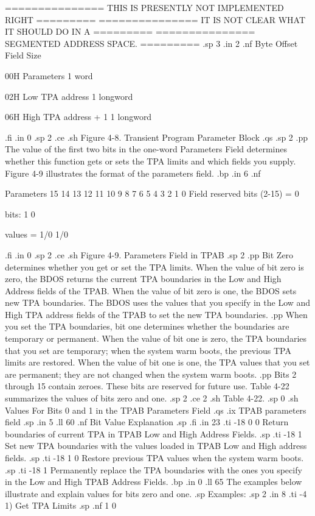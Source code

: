 =============== THIS IS PRESENTLY NOT IMPLEMENTED RIGHT =========
=============== IT IS NOT CLEAR WHAT IT SHOULD DO IN A  =========
=============== SEGMENTED ADDRESS SPACE.                =========
.sp 3
.in 2
.nf
Byte Offset            Field                        Size
   
 00H              Parameters                       1 word  

 02H              Low TPA address                  1 longword

 06H              High TPA address + 1             1 longword

.fi
.in 0
.sp 2
.ce
.sh 
Figure 4-8.  Transient Program Parameter Block
.qs
.sp 2
.pp
The value of the first two bits in the one-word Parameters Field 
determines whether 
this function gets or sets the TPA limits and which fields you 
supply. Figure 4-9 illustrates the
format of the parameters field.
.bp
.in 6
.nf
   
 Parameters    15 14 13 12 11 10 9 8 7 6 5 4 3 2 1 0   
 Field        
                   reserved bits (2-15) = 0      



                 bits:         1      0 

                 values =     1/0    1/0   

.fi
.in 0
.sp 2
.ce
.sh 
Figure 4-9.  Parameters Field in TPAB
.sp 2
.pp
Bit Zero  determines whether you get or set the TPA limits.  When
the value of bit zero is zero, the BDOS returns the current TPA
boundaries in the Low and High Address fields of the TPAB.  When the value of 
bit zero is one, the BDOS sets new TPA
boundaries.  The BDOS uses the values that you specify in the Low
and High TPA address fields of the TPAB to set the new TPA
boundaries.  
.pp
When you set the TPA boundaries, bit one determines whether the boundaries 
are temporary or permanent.  When the value of bit one is zero, 
the TPA boundaries that you set are temporary; when the system warm boots,
the previous TPA limits are restored.  When the value of bit one is 
one, the TPA values that you set are permanent; they are not 
changed when the system warm boots. 
.pp
Bits 2 through 15 contain zeroes.  These bits are reserved for future use.  
Table 4-22 summarizes the values of bits zero and one. 
.sp 2 
.ce 2
.sh 
Table 4-22.  
.sp 0
.sh
Values For Bits 0 and 1 in the TPAB Parameters Field
.qs
.ix TPAB parameters field
.sp
.in 5
.ll 60
.nf
Bit    Value                      Explanation
.sp
.fi
.in 23
.ti -18
0        0        Return boundaries of current TPA in TPAB Low and High 
Address Fields.
.sp
.ti -18
         1        Set new TPA boundaries with the values loaded in TPAB Low 
and High address fields.
.sp
.ti -18
1        0        Restore previous TPA values when the system warm boots.
.sp
.ti -18
         1        Permanently replace the TPA boundaries with the ones you 
specify in the Low and High TPAB Address Fields.
.bp
.in 0
.ll 65
The examples below illustrate and explain values for bits zero and 
one.
.sp
Examples:
.sp 2
.in 8
.ti -4
1)  Get TPA Limits
.sp
.nf
                         1       0               
  
